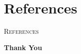 \documentclass[aspectratio=169]{beamer}
\begin{document}
\section{References}
\begin{frame}[allowframebreaks]{\textsc{References}}
\scriptsize


\end{frame}

\begin{frame}{\textsc{}}
    \centering
    \vspace{2cm}
    \Huge
    \textbf{Thank You}
\end{frame}
\end{document}
